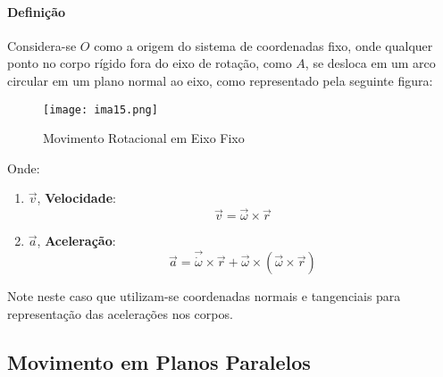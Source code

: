 \documentclass{article}
\begin{document}
            \paragraph{Definição}Considera-se $O$ como a origem do sistema de coordenadas fixo, onde qualquer ponto no corpo rígido fora do eixo de rotação, como $A$, se desloca em um arco circular em um plano normal ao eixo, como representado pela seguinte figura:
                \begin{figure}[H]
                    \centering
                    \texttt{[image: ima15.png]}
                    \caption{Movimento Rotacional em Eixo Fixo}
                \end{figure}\noindent
            Onde:
                \begin{enumerate}
                    \item $\vec{v}$, \textbf{Velocidade}:
                        \begin{equation}
                            \boxed{
                                \vec{v} = \vec{\omega}\times\vec{r}
                            }
                        \end{equation}

                    \item $\vec{a}$, \textbf{Aceleração}:
                        \begin{equation}
                            \boxed{
                                \vec{a} = 
                                \vec{\dot{\omega}}\times\vec{r} +
                                \vec{\omega}\times(\vec{\omega}\times\vec{r})
                            }
                        \end{equation}
                \end{enumerate}
            Note neste caso que utilizam-se coordenadas normais e tangenciais para representação das acelerações nos corpos.

        \subsection{Movimento em Planos Paralelos}
\end{document}
